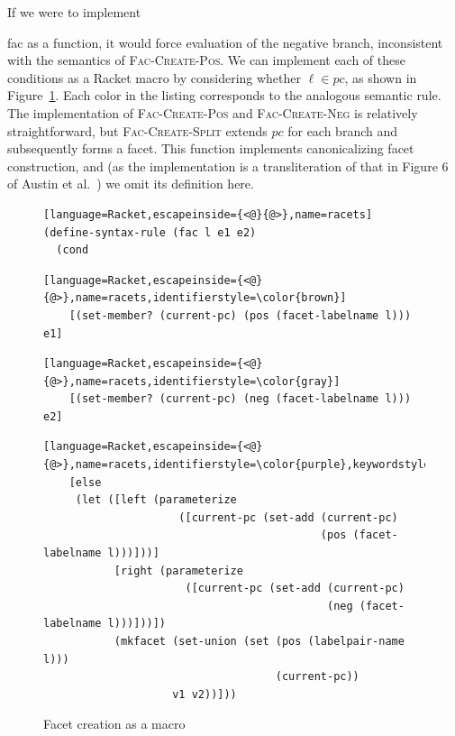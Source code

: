 \documentclass[review=true,acmlarge]{acmart}
\newcommand*{\SavedLstInline}{}
\DeclareRobustCommand*{\lstinline}{%
  \ifmmode
    \let\SavedBGroup\bgroup
    \def\bgroup{%
      \let\bgroup\SavedBGroup
      \hbox\bgroup
    }%
  \fi
  \SavedLstInline
}
\newcommand{\bmth}[1] {{\color{colorMATH} $#1$}}
\newcommand{\code}[1]{\lstinline{#1}}
\begin{document}
If we were to implement \code{fac} as a function, it would force
evaluation of the negative branch, inconsistent with the semantics of
\textsc{Fac-Create-Pos}. We can implement each of these conditions as
a Racket macro by considering whether \bmth{\ell \in pc}, as shown in
Figure~\ref{fig:fac-create}. Each color in the listing corresponds to
the analogous semantic rule. The implementation of
\textsc{Fac-Create-Pos} and \textsc{Fac-Create-Neg} is relatively
straightforward, but \textsc{Fac-Create-Split} extends \bmth{pc} for
each branch and subsequently forms a facet. This function implements
canonicalizing facet construction, and (as the implementation is a
transliteration of that in Figure 6 of Austin et
al.~\cite{Austin:2012}) we omit its definition here.

\begin{figure}
{\small
\begin{lstlisting}[language=Racket,escapeinside={<@}{@>},name=racets]
(define-syntax-rule (fac l e1 e2)
  (cond
\end{lstlisting}
\vspace{-.7\baselineskip}
{\color{brown}
\begin{lstlisting}[language=Racket,escapeinside={<@}{@>},name=racets,identifierstyle=\color{brown}]
    [(set-member? (current-pc) (pos (facet-labelname l))) e1]
\end{lstlisting}
}
\vspace{-.7\baselineskip}
{\color{gray}
\begin{lstlisting}[language=Racket,escapeinside={<@}{@>},name=racets,identifierstyle=\color{gray}]
    [(set-member? (current-pc) (neg (facet-labelname l))) e2]
\end{lstlisting}
}
\vspace{-.7\baselineskip}
{\small\color{purple}
\begin{lstlisting}[language=Racket,escapeinside={<@}{@>},name=racets,identifierstyle=\color{purple},keywordstyle=\color{purple}]
    [else
     (let ([left (parameterize
                     ([current-pc (set-add (current-pc)
                                           (pos (facet-labelname l)))]))]
           [right (parameterize
                      ([current-pc (set-add (current-pc)
                                            (neg (facet-labelname l)))]))])
           (mkfacet (set-union (set (pos (labelpair-name l)))
                                    (current-pc))
                    v1 v2))]))
\end{lstlisting}}
}
\caption{Facet creation as a macro}
\label{fig:fac-create}
\end{figure}
\end{document}
